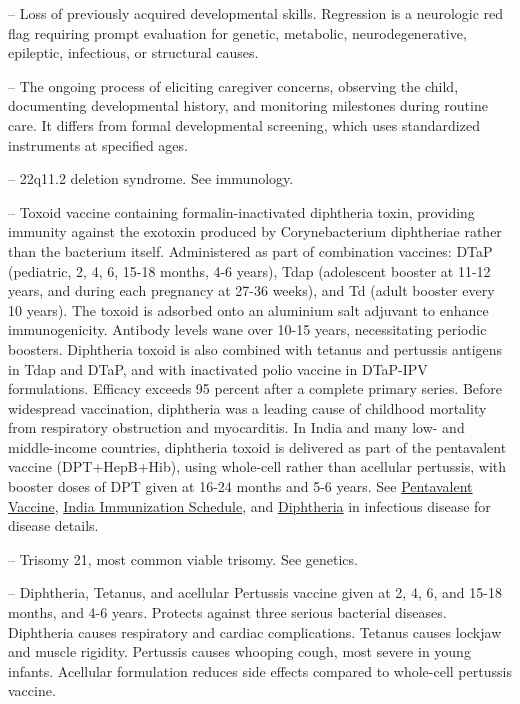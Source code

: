 -- Loss of previously acquired developmental skills. Regression is a neurologic red flag requiring prompt evaluation for genetic, metabolic, neurodegenerative, epileptic, infectious, or structural causes.

-- The ongoing process of eliciting caregiver concerns, observing the child, documenting developmental history, and monitoring milestones during routine care. It differs from formal developmental screening, which uses standardized instruments at specified ages.

-- 22q11.2 deletion syndrome. See immunology.

-- Toxoid vaccine containing formalin-inactivated diphtheria toxin, providing immunity against the exotoxin produced by Corynebacterium diphtheriae rather than the bacterium itself. Administered as part of combination vaccines: DTaP (pediatric, 2, 4, 6, 15-18 months, 4-6 years), Tdap (adolescent booster at 11-12 years, and during each pregnancy at 27-36 weeks), and Td (adult booster every 10 years). The toxoid is adsorbed onto an aluminium salt adjuvant to enhance immunogenicity. Antibody levels wane over 10-15 years, necessitating periodic boosters. Diphtheria toxoid is also combined with tetanus and pertussis antigens in Tdap and DTaP, and with inactivated polio vaccine in DTaP-IPV formulations. Efficacy exceeds 95 percent after a complete primary series. Before widespread vaccination, diphtheria was a leading cause of childhood mortality from respiratory obstruction and myocarditis. In India and many low- and middle-income countries, diphtheria toxoid is delivered as part of the pentavalent vaccine (DPT+HepB+Hib), using whole-cell rather than acellular pertussis, with booster doses of DPT given at 16-24 months and 5-6 years. See \hyperlink{Pentavalent Vaccine}{Pentavalent Vaccine}, \hyperlink{India Immunization Schedule}{India Immunization Schedule}, and \hyperlink{Diphtheria}{Diphtheria} in infectious disease for disease details.

-- Trisomy 21, most common viable trisomy. See genetics.

-- Diphtheria, Tetanus, and acellular Pertussis vaccine given at 2, 4, 6, and 15-18 months, and 4-6 years. Protects against three serious bacterial diseases. Diphtheria causes respiratory and cardiac complications. Tetanus causes lockjaw and muscle rigidity. Pertussis causes whooping cough, most severe in young infants. Acellular formulation reduces side effects compared to whole-cell pertussis vaccine.

